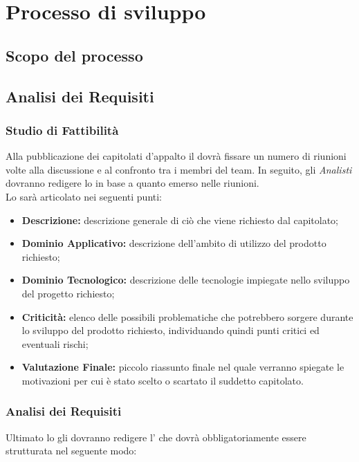 \section{Processo di sviluppo}

\subsection{Scopo del processo}

\subsection{Analisi dei Requisiti}
\subsubsection{Studio di Fattibilità}
Alla pubblicazione dei capitolati d'appalto il \textit{\RdP} dovrà fissare un 
numero di riunioni volte alla discussione e al confronto tra i membri del team. 
In seguito, gli \textit{Analisti} dovranno redigere lo \textit{\SdF} in base a quanto 
emerso nelle riunioni.\\
Lo \textit{\SdF} sarà articolato nei seguenti punti:
\begin{itemize}
  \item \textbf{Descrizione:} descrizione generale di ciò che viene richiesto 
  dal capitolato;
  \item \textbf{Dominio Applicativo:} descrizione dell'ambito di utilizzo del 
  prodotto richiesto;
  \item \textbf{Dominio Tecnologico:} descrizione delle tecnologie impiegate 
  nello sviluppo del progetto richiesto;
  \item \textbf{Criticità:} elenco delle possibili problematiche che potrebbero 
  sorgere durante lo sviluppo del prodotto richiesto, individuando quindi punti 
  critici ed eventuali rischi;
  \item \textbf{Valutazione Finale:} piccolo riassunto finale nel quale verranno 
  spiegate le motivazioni per cui è stato scelto o scartato il suddetto 
  capitolato.
\end{itemize}

\subsubsection{Analisi dei Requisiti}
Ultimato lo \textit{\SdF} gli \textit{\Anas} dovranno redigere l'\textit{\AdR} 
che dovrà obbligatoriamente essere strutturata nel seguente modo:

